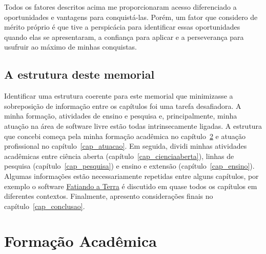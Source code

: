 \documentclass[12pt,a4paper,oneside]{book}
\begin{document}
Todos os fatores descritos acima me proporcionaram acesso diferenciado a
oportunidades e vantagens para conquistá-las.
Porém, um fator que considero de mérito próprio é que tive a perspicácia para
identificar essas oportunidades quando elas se apresentaram, a confiança para
aplicar e a perseverança para usufruir ao máximo de minhas conquistas.

\section{A estrutura deste memorial}

Identificar uma estrutura coerente  para este memorial que minimizasse a
sobreposição de informação entre os capítulos foi uma tarefa desafiadora.
A minha formação, atividades de ensino e pesquisa e, principalmente, minha
atuação na área de software livre estão todas intrinsecamente ligadas.
A estrutura que concebi começa pela minha formação acadêmica no
capítulo~\ref{cap_formacao} e atuação profissional no
capítulo~\ref{cap_atuacao}.
Em seguida, dividi minhas atividades acadêmicas
entre ciência aberta (capítulo~\ref{cap_cienciaaberta}),
linhas de pesquisa (capítulo~\ref{cap_pesquisa})
e ensino e extensão (capítulo~\ref{cap_ensino}).
Algumas informações estão necessariamente repetidas entre alguns capítulos,
por exemplo o software \href{https://www.fatiando.org}{Fatiando a Terra}
é discutido em quase todos os capítulos em diferentes contextos.
Finalmente, apresento considerações finais no capítulo~\ref{cap_conclusao}.


\chapter{Formação Acadêmica}
\label{cap_formacao}
\end{document}
